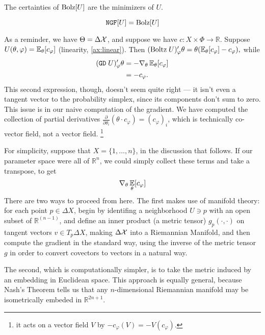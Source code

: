 \documentclass{article}
\begin{document}
The certainties of $\mathrm{Bolz}[U]$ are the minimizers of $U$.


\begin{prop}
    \[
        \mathtt{NGF}[U] = \mathrm{Bolz}[U]
    \]
\end{prop}

\begin{wip}
    As a reminder, we have $\Theta = \Delta \mathcal X$, and suppose we have $c : X \times \Phi \to \mathbb R$.
    Suppose $U(\theta, \varphi) = \operatorname*{\mathbb{E}}_\theta[ c_\varphi ]$ (linearity, \cref{ax:linear}).
    Then
    $%
        (\mathrm{Boltz}\;U)'_\varphi \theta = \theta(\Ex_\theta[c_\varphi] - c_\varphi),
    $%
    while
    \begin{align*}
         (\mathtt{GD}\; U)'_\varphi \theta &=
             - \nabla_{\theta} \operatorname*{\mathbb{E}}\nolimits_\theta [ c_\varphi ]
             \\ &= - c_\varphi
             .
    \end{align*}
    This second expression, though, doesn't seem quite right --- it isn't even a tangent vector to the probability simplex, since its components don't sum to zero.
    This issue is in our naive computation of the gradient.
    We have computed the collection of partial derivatives $\frac{\partial}{\partial \theta_i} ( \theta \cdot  c_\varphi) = (c_\varphi)_i$,
    which is technically  co-vector field, not a vector field.%
        \footnote{it acts on a vector field $V$ by $ -c_\varphi ( V ) = - V(c_\varphi)$.}

    For simplicity, suppose that $X = \{1, \ldots, n\}$, in the discussion that follows.
    If our parameter space were all of $\mathbb R^n$, we could simply collect these terms and take a transpose, to get
    \[
        \nabla_\theta \operatorname*{\mathbb{E}}_{\theta}[c_\varphi]
    \]
    There are two ways to proceed from here.
    The first makes use of manifold theory: for each point $p \in \Delta X$, begin by identifing a neighborhood $U \ni p$ with an open subset of $\mathbb R^{(n-1)}$, and define an inner product (a metric tensor) $g_p(\cdot, \cdot)$ on tangent vectors $v \in T_p\Delta X$, making $\Delta\mathcal X$ into a Riemannian Manifold, and then compute the gradient in the standard way, using the inverse of the metric tensor $g$ in order to convert covectors to vectors in a natural way.

    The second, which is computationally simpler, is to take the metric induced by an embedding in Euclidean space.
    This approach is equally general, because Nash's Theorem \parencite{nash1956imbedding} tells us that any $n$-dimensional Riemannian manifold may be isometrically embeded in $\mathbb R^{2n+1}$.



\end{wip}
\end{document}
